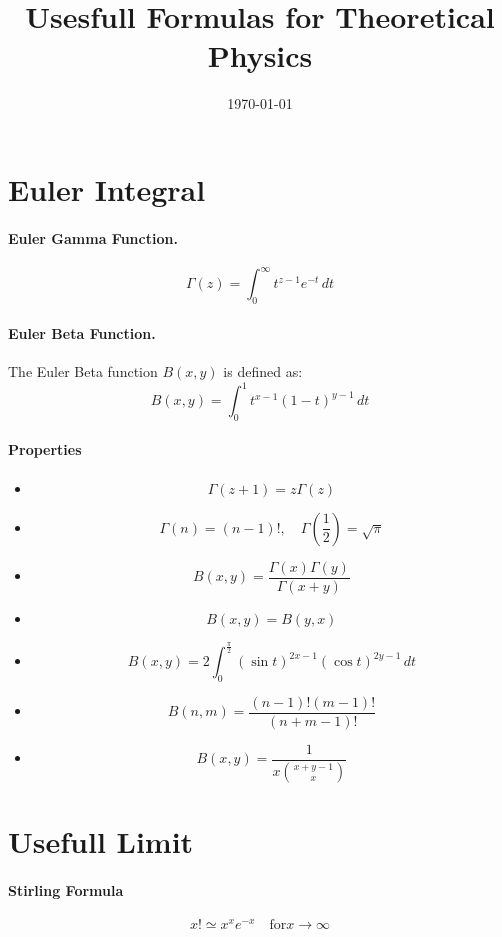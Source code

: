 \documentclass{article}
\begin{document}
\title{Usesfull Formulas for Theoretical Physics}
\date{\today}
\maketitle

\section{Euler Integral}
\paragraph{Euler Gamma Function.}
\[
\Gamma(z) = \int_{0}^{\infty} t^{z-1} e^{-t} \, dt
\]
\paragraph{Euler Beta Function.}
The Euler Beta function $B(x, y)$ is defined as:
\[
B(x, y) = \int_{0}^{1} t^{x-1} (1-t)^{y-1} \, dt
\]
\paragraph{Properties}
\begin{itemize}
    \item 
    \[
    \Gamma(z+1) = z \Gamma(z)
    \]
    \item 
    \[
    \Gamma(n) = (n-1)!, \quad \Gamma\left(\frac{1}{2}\right) = \sqrt{\pi}
    \]
    \item 
    \[
    B(x, y) = \frac{\Gamma(x)\Gamma(y)}{\Gamma(x+y)}
    \]
    \item 
    \[
    B(x, y) = B(y, x)
    \]
    \item
    \[
    B(x, y) = 2 \int_{0}^{\frac{\pi}{2}} (\sin t)^{2x-1} (\cos t)^{2y-1} \, dt
    \]
    \item
    \[
    B(n, m) = \frac{(n-1)!(m-1)!}{(n+m-1)!}
    \]
    \item 
    \[
    B(x, y) = \frac{1}{x \binom{x+y-1}{x}}
    \]
\end{itemize}

\section{Usefull Limit}
\paragraph{Stirling Formula}
\[
x! \simeq x^{x} e^{-x} \quad \text{for} x \longrightarrow \infty 
\]
\end{document}
